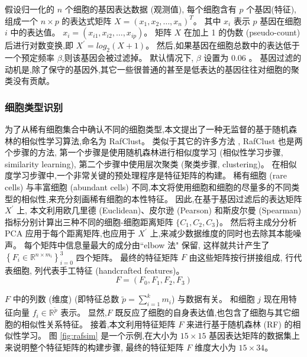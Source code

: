 假设归一化的 $n$ 个细胞的基因表达数据 (观测值), 每个细胞含有 $p$ 个基因(特征),
组成一个 $n \times p$ 的表达式矩阵 $X=\left(x_{1}, x_{2}, \ldots, x_{n} \right)^ T$。
其中 $x_{i}$ 表示 $p$ 基因在细胞 $i$ 中的表达值。
$x_{i}=\left(x_{i1}, x_{i2},\ldots, x_{ip} \right)$。
矩阵 $X$ 在加上 1 的伪数 (pseudo-count) 后进行对数变换,即 $X^{\prime} = log_2 (X + 1)$。
然后,如果基因在细胞总数中的表达低于一个预定频率 $\beta$,则该基因会被过滤掉。
默认情况下, $\beta$ 设置为 0.06 。 
基因过滤的动机是,除了保守的基因外,其它一些很普通的甚至是低表达的基因往往对细胞的聚类没有贡献。

\subsubsection{细胞类型识别}
\label{subsec:rafclust} 
为了从稀有细胞集合中确认不同的细胞类型,本文提出了一种无监督的基于随机森林的相似性学习算法,命名为 RafClust。
类似于其它的许多方法 ,
RafClust 也是两个步骤的方法,
第一个步骤是使用随机森林进行相似度学习 (相似性学习步骤, similarity learning),
第二个步骤中使用层次聚类 (聚类步骤, clustering)。
在相似度学习步骤中,一个非常关键的预处理程序是特征矩阵的构建。
稀有细胞 (rare cells) 与丰富细胞 (abundant cells) 不同,本文将使用细胞和细胞的尽量多的不同类型的相似性,来充分刻画稀有细胞的本性特征。
因此,在基于基因过滤后的表达矩阵 $X^{\prime}$ 上,
本文利用欧几里德 (Euclidean)、皮尔逊 (Pearson) 和斯皮尔曼 (Spearman) 指标分别计算出三种不同的细胞-细胞距离矩阵 $\{C_1, C_2, C_3\}$。
然后将主成分分析 PCA 应用于每个距离矩阵,也应用于 $X^{\prime}$ 上,来减少数据维度的同时也去除其本能噪声。
每个矩阵中信息量最大的成分由``elbow 法"  保留,
这样就共计产生了 $\left\{ {F}_{i} \in \mathbb {R} ^ {n \times m_{i}} \right\}_{i = 0}^{3}$ 四个矩阵。
最终的特征矩阵 $F$ 由这些矩阵按行拼接组成, 行代表细胞, 列代表手工特征 (handcrafted features)。
\begin{equation}
\label{lab:f}
{F} = ({F}_{0}, {F}_{1}, {F}_{2}, {F}_{3})
\end{equation}

$F$ 中的列数 (维度) (即特征总数 $\tilde {p} = \sum_{i = 1}^{k} m_{i}$) 与数据有关。
和细胞 $j$ 现在用特征向量 $f_{i} \in \mathbb {R} ^ {\tilde{p}}$ 表示。
显然,$F$ 既反应了细胞的自身表达值,也包含了细胞与其它细胞的相似性关系特征。
接着,本文利用特征矩阵 $F$ 来进行基于随机森林 (RF) 的相似性学习。
图 \ref{fig:rafsim} 是一个示例,在大小为 $15 \times 15$ 基因表达矩阵的数据集上来说明整个特征矩阵的构建步骤,
最终的特征矩阵 $F$ 维度大小为 $15\times34$。

